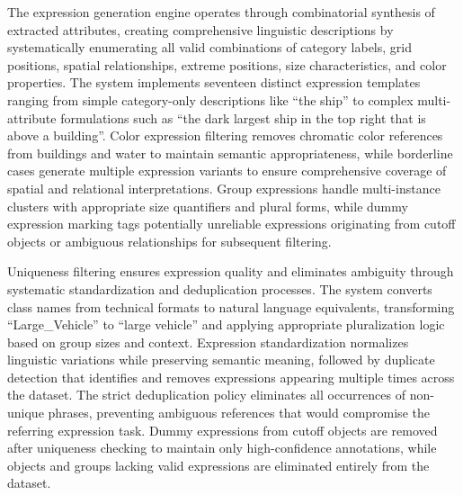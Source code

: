 The expression generation engine operates through combinatorial synthesis of extracted attributes, creating comprehensive linguistic descriptions by systematically enumerating all valid combinations of category labels, grid positions, spatial relationships, extreme positions, size characteristics, and color properties. The system implements seventeen distinct expression templates ranging from simple category-only descriptions like ``the ship'' to complex multi-attribute formulations such as ``the dark largest ship in the top right that is above a building''. Color expression filtering removes chromatic color references from buildings and water to maintain semantic appropriateness, while borderline cases generate multiple expression variants to ensure comprehensive coverage of spatial and relational interpretations. Group expressions handle multi-instance clusters with appropriate size quantifiers and plural forms, while dummy expression marking tags potentially unreliable expressions originating from cutoff objects or ambiguous relationships for subsequent filtering.

Uniqueness filtering ensures expression quality and eliminates ambiguity through systematic standardization and deduplication processes. The system converts class names from technical formats to natural language equivalents, transforming ``Large\_Vehicle'' to ``large vehicle'' and applying appropriate pluralization logic based on group sizes and context. Expression standardization normalizes linguistic variations while preserving semantic meaning, followed by duplicate detection that identifies and removes expressions appearing multiple times across the dataset. The strict deduplication policy eliminates all occurrences of non-unique phrases, preventing ambiguous references that would compromise the referring expression task. Dummy expressions from cutoff objects are removed after uniqueness checking to maintain only high-confidence annotations, while objects and groups lacking valid expressions are eliminated entirely from the dataset.

